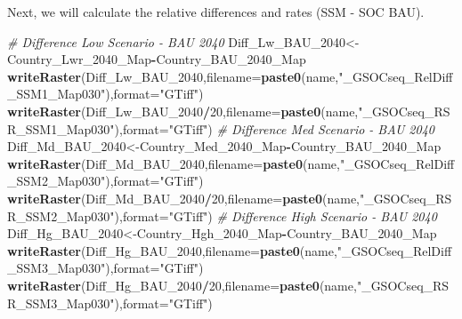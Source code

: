 \documentclass[
  10pt,
  b5paper,
]{book}
\newenvironment{Shaded}{\begin{snugshade}}{\end{snugshade}}
\newcommand{\CommentTok}[1]{\textcolor[rgb]{0.56,0.35,0.01}{\textit{#1}}}
\newcommand{\DataTypeTok}[1]{\textcolor[rgb]{0.13,0.29,0.53}{#1}}
\newcommand{\DecValTok}[1]{\textcolor[rgb]{0.00,0.00,0.81}{#1}}
\newcommand{\KeywordTok}[1]{\textcolor[rgb]{0.13,0.29,0.53}{\textbf{#1}}}
\newcommand{\NormalTok}[1]{#1}
\newcommand{\OperatorTok}[1]{\textcolor[rgb]{0.81,0.36,0.00}{\textbf{#1}}}
\newcommand{\StringTok}[1]{\textcolor[rgb]{0.31,0.60,0.02}{#1}}
\begin{document}
Next, we will calculate the relative differences and rates (SSM - SOC BAU).

\begin{Shaded}
\begin{Highlighting}[]
\CommentTok{# Difference Low Scenario - BAU 2040}
\NormalTok{Diff_Lw_BAU_}\DecValTok{2040}\NormalTok{<-Country_Lwr_}\DecValTok{2040}\NormalTok{_Map}\OperatorTok{-}\NormalTok{Country_BAU_}\DecValTok{2040}\NormalTok{_Map}
\KeywordTok{writeRaster}\NormalTok{(Diff_Lw_BAU_}\DecValTok{2040}\NormalTok{,}\DataTypeTok{filename=}\KeywordTok{paste0}\NormalTok{(name,}\StringTok{"_GSOCseq_RelDiff_SSM1_Map030"}\NormalTok{),}\DataTypeTok{format=}\StringTok{"GTiff"}\NormalTok{)}
\KeywordTok{writeRaster}\NormalTok{(Diff_Lw_BAU_}\DecValTok{2040}\OperatorTok{/}\DecValTok{20}\NormalTok{,}\DataTypeTok{filename=}\KeywordTok{paste0}\NormalTok{(name,}\StringTok{"_GSOCseq_RSR_SSM1_Map030"}\NormalTok{),}\DataTypeTok{format=}\StringTok{"GTiff"}\NormalTok{)}
\CommentTok{# Difference Med Scenario - BAU 2040}
\NormalTok{Diff_Md_BAU_}\DecValTok{2040}\NormalTok{<-Country_Med_}\DecValTok{2040}\NormalTok{_Map}\OperatorTok{-}\NormalTok{Country_BAU_}\DecValTok{2040}\NormalTok{_Map}
\KeywordTok{writeRaster}\NormalTok{(Diff_Md_BAU_}\DecValTok{2040}\NormalTok{,}\DataTypeTok{filename=}\KeywordTok{paste0}\NormalTok{(name,}\StringTok{"_GSOCseq_RelDiff_SSM2_Map030"}\NormalTok{),}\DataTypeTok{format=}\StringTok{"GTiff"}\NormalTok{)}
\KeywordTok{writeRaster}\NormalTok{(Diff_Md_BAU_}\DecValTok{2040}\OperatorTok{/}\DecValTok{20}\NormalTok{,}\DataTypeTok{filename=}\KeywordTok{paste0}\NormalTok{(name,}\StringTok{"_GSOCseq_RSR_SSM2_Map030"}\NormalTok{),}\DataTypeTok{format=}\StringTok{"GTiff"}\NormalTok{)}
\CommentTok{# Difference High Scenario - BAU 2040}
\NormalTok{Diff_Hg_BAU_}\DecValTok{2040}\NormalTok{<-Country_Hgh_}\DecValTok{2040}\NormalTok{_Map}\OperatorTok{-}\NormalTok{Country_BAU_}\DecValTok{2040}\NormalTok{_Map}
\KeywordTok{writeRaster}\NormalTok{(Diff_Hg_BAU_}\DecValTok{2040}\NormalTok{,}\DataTypeTok{filename=}\KeywordTok{paste0}\NormalTok{(name,}\StringTok{"_GSOCseq_RelDiff_SSM3_Map030"}\NormalTok{),}\DataTypeTok{format=}\StringTok{"GTiff"}\NormalTok{)}
\KeywordTok{writeRaster}\NormalTok{(Diff_Hg_BAU_}\DecValTok{2040}\OperatorTok{/}\DecValTok{20}\NormalTok{,}\DataTypeTok{filename=}\KeywordTok{paste0}\NormalTok{(name,}\StringTok{"_GSOCseq_RSR_SSM3_Map030"}\NormalTok{),}\DataTypeTok{format=}\StringTok{"GTiff"}\NormalTok{)}
\end{Highlighting}
\end{Shaded}
\end{document}

